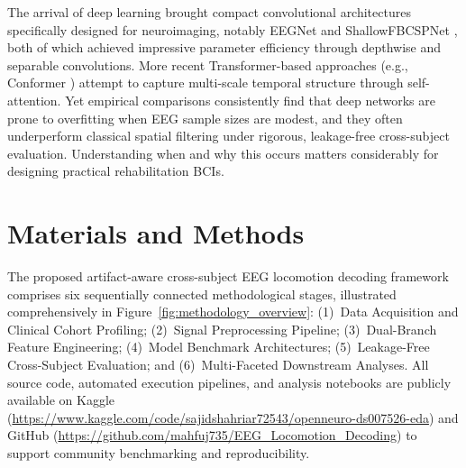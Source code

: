 \documentclass[11pt,a4paper]{article}
\begin{document}
The arrival of deep learning brought compact convolutional architectures specifically designed for neuroimaging, notably EEGNet \cite{lawhern2018eegnet} and ShallowFBCSPNet \cite{schirrmeister2017eeg}, both of which achieved impressive parameter efficiency through depthwise and separable convolutions. More recent Transformer-based approaches (e.g., Conformer \cite{song2022eeg}) attempt to capture multi-scale temporal structure through self-attention. Yet empirical comparisons \cite{lotte2018review, roy2019deep} consistently find that deep networks are prone to overfitting when EEG sample sizes are modest, and they often underperform classical spatial filtering under rigorous, leakage-free cross-subject evaluation. Understanding when and why this occurs matters considerably for designing practical rehabilitation BCIs.


\section{Materials and Methods}
\label{sec:methods}

The proposed artifact-aware cross-subject EEG locomotion decoding framework comprises six sequentially connected methodological stages, illustrated comprehensively in Figure~\ref{fig:methodology_overview}: (1)~Data Acquisition and Clinical Cohort Profiling; (2)~Signal Preprocessing Pipeline; (3)~Dual-Branch Feature Engineering; (4)~Model Benchmark Architectures; (5)~Leakage-Free Cross-Subject Evaluation; and (6)~Multi-Faceted Downstream Analyses. All source code, automated execution pipelines, and analysis notebooks are publicly available on Kaggle (\url{https://www.kaggle.com/code/sajidshahriar72543/openneuro-ds007526-eda}) and GitHub (\url{https://github.com/mahfuj735/EEG_Locomotion_Decoding}) to support community benchmarking and reproducibility.
\end{document}
